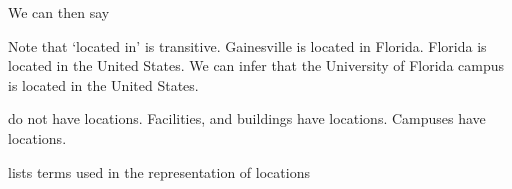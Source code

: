 \documentclass[letterpaper,10pt,english]{sphinxmanual}
\begin{document}
\sphinxAtStartPar
We can then say

\begin{sphinxVerbatim}[commandchars=\\\{\}]
          
       
       
\end{sphinxVerbatim}

\sphinxAtStartPar
Note that ‘located in’ is transitive.  Gainesville is located in Florida.  Florida is
located in the United States.  We can infer that the University of Florida campus is
located in the United States.

\sphinxAtStartPar
{\hyperref[\detokenize{organizations::doc}]{}} do not have locations.  Facilities, and buildings
have locations. Campuses have locations.

\sphinxAtStartPar
{\hyperref[\detokenize{locations:table-15}]{}} lists terms used in the representation of locations
\end{document}
